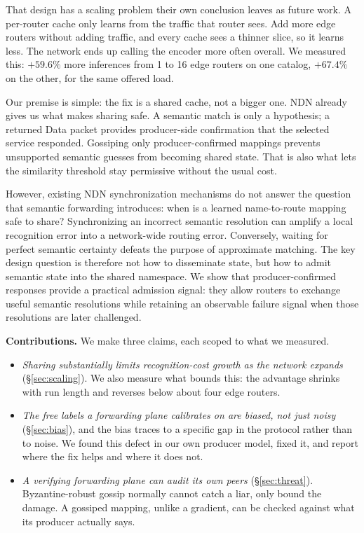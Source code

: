 \documentclass[conference]{IEEEtran}
\begin{document}
		That design has a scaling problem their own conclusion leaves as future work.
		A per-router cache only learns from the traffic that router sees. Add more
		edge routers without adding traffic, and every cache sees a thinner slice, so
		it learns less. The network ends up calling the encoder more often overall.
		We measured this: $+59.6\%$ more inferences from 1 to 16 edge routers on one
		catalog, $+67.4\%$ on the other, for the same offered load.
		
		Our premise is simple: the fix is a shared cache, not a bigger one. NDN
		already gives us what makes sharing safe. A semantic match is only a hypothesis; a returned Data packet provides
		producer-side confirmation that the selected service responded. Gossiping only producer-confirmed mappings
		prevents unsupported semantic guesses from becoming shared state. That is also what lets the similarity threshold stay
		permissive without the usual cost.
		
		However, existing NDN synchronization mechanisms do not answer the question
		that semantic forwarding introduces: when is a learned name-to-route mapping
		safe to share? Synchronizing an incorrect semantic resolution can amplify a
		local recognition error into a network-wide routing error. Conversely, waiting
		for perfect semantic certainty defeats the purpose of approximate matching.
		The key design question is therefore not how to disseminate state, but how to
		admit semantic state into the shared namespace. We show that producer-confirmed
		responses provide a practical admission signal: they allow routers to exchange
		useful semantic resolutions while retaining an observable failure signal when
		those resolutions are later challenged.
		
		\textbf{Contributions.} We make three claims, each scoped to what we
		measured.
		
		\begin{itemize}
			\item \emph{Sharing substantially limits recognition-cost growth as the network expands} (\S\ref{sec:scaling}). We also
			measure what bounds this: the advantage shrinks with run length and
			reverses below about four edge routers.
			\item \emph{The free labels a forwarding plane calibrates on are biased,
				not just noisy} (\S\ref{sec:bias}), and the bias traces to a specific
			gap in the protocol rather than to noise. We found this defect in our
			own producer model, fixed it, and report where the fix helps and where
			it does not.
			\item \emph{A verifying forwarding plane can audit its own peers}
			(\S\ref{sec:threat}). Byzantine-robust gossip normally cannot catch a
			liar, only bound the damage. A gossiped mapping, unlike a gradient, can
			be checked against what its producer actually says.
		\end{itemize}
		
\end{document}
